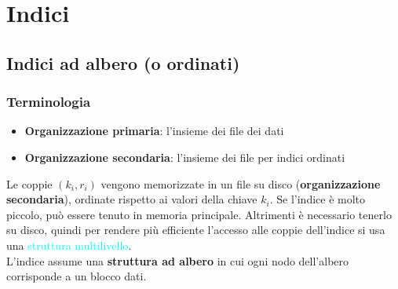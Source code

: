 \documentclass[12pt, a4paper]{report}
\begin{document}
    \section{Indici}
    \subsection{Indici ad albero (o ordinati)}
    \subsubsection{Terminologia}
    \begin{itemize}
        \item \textbf{Organizzazione primaria}: l'insieme dei file dei dati
        \item \textbf{Organizzazione secondaria}: l'insieme dei file per indici ordinati
    \end{itemize}
    Le coppie $(k_{i},r_{i})$ vengono memorizzate in un file su disco (\textbf{organizzazione secondaria}), ordinate rispetto ai valori della chiave $k_{i}$. Se l'indice è molto piccolo, può essere tenuto in memoria principale. Altrimenti è necessario tenerlo su disco, quindi per rendere più efficiente l'accesso alle coppie dell'indice si usa una \textcolor{Cyan}{struttura multilivello}.\\
L'indice assume una \textbf{struttura ad albero} in cui ogni nodo dell'albero corrisponde a un blocco dati.
\end{document}
